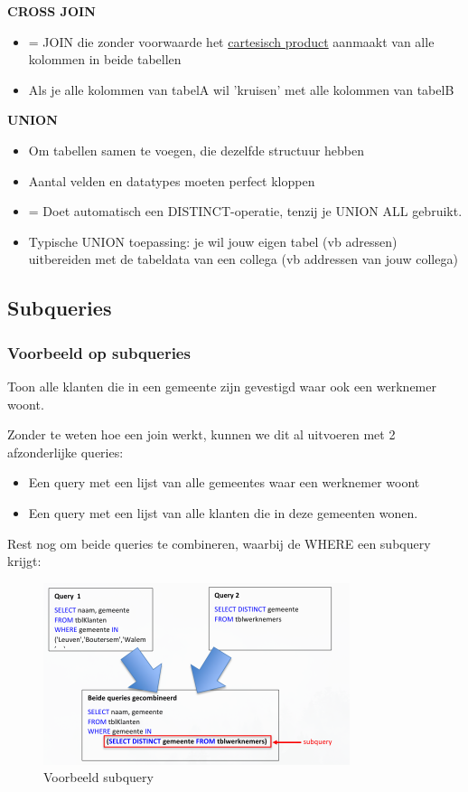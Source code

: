 \documentclass{article}
\newcommand{\bold}[1]{\textbf{#1}}
\begin{document}
\bold{CROSS JOIN}
\begin{itemize}
    \item = JOIN die zonder voorwaarde het \underline{cartesisch product} aanmaakt van alle kolommen in beide tabellen
    \item Als je alle kolommen van tabelA wil 'kruisen' met alle kolommen van tabelB
\end{itemize}
\bold{UNION}
\begin{itemize}
    \item Om tabellen samen te voegen, die dezelfde structuur hebben
    \item Aantal velden en datatypes moeten perfect kloppen 
    \item = Doet automatisch een DISTINCT-operatie, tenzij je UNION ALL gebruikt.
    \item Typische UNION toepassing: je wil jouw eigen tabel (vb adressen) uitbereiden met de tabeldata van een collega (vb addressen van jouw collega)
\end{itemize}

\subsection{Subqueries}
\subsubsection{Voorbeeld op subqueries}

Toon alle klanten die in een gemeente zijn gevestigd waar ook een werknemer woont. 

Zonder te weten hoe een join werkt, kunnen we dit al uitvoeren met 2 afzonderlijke queries:

\begin{itemize}
    \item Een query met een lijst van alle gemeentes waar een werknemer woont
    \item Een query met een lijst van alle klanten die in deze gemeenten wonen.
\end{itemize} 

Rest nog om beide queries te combineren, waarbij de WHERE een subquery krijgt:


\begin{figure}[H]
    \centering
    \includegraphics[width=0.8\textwidth]{Screenshot_20200226_153136.png}
    \caption{Voorbeeld subquery}
\end{figure}
\end{document}
